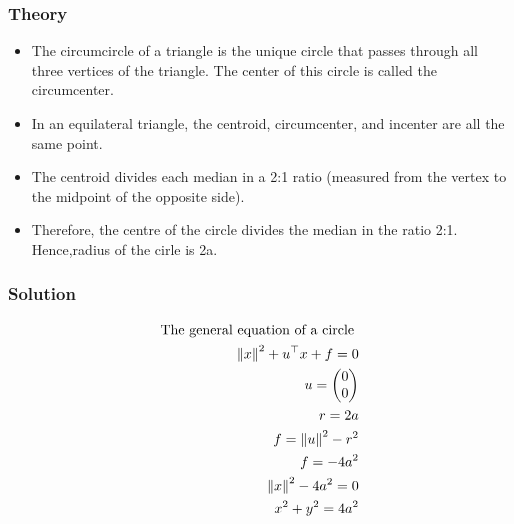\documentclass{beamer}
\begin{document}
\begin{frame}
\frametitle{Theory}

     \begin{itemize}

     \item The circumcircle of a triangle is the unique circle that passes through all three vertices of the triangle. The center of this circle is called the circumcenter.
     
    \item   In an equilateral triangle, the centroid, circumcenter, and incenter are all the same point.
    
    \item  The centroid divides each median in a 2:1 ratio (measured from the vertex to the midpoint of the opposite side).
    
    \item  Therefore, the centre of the circle divides the median in the ratio 2:1. Hence,radius of the cirle is 2a.
    \end{itemize}
    
\end{frame}

\begin{frame}
\frametitle{Solution}
\begin{align}
   \text{The general equation of a circle }\\
{\left\lVert x\right\rVert} ^ 2 + {u}^\top x + f =0\\
u = \begin{pmatrix}0\\ 0\end{pmatrix}\\
r = 2a\\
f = {\left\lVert u\right\rVert}^2 - {r}^2 \\
f = -4 {a} ^2\\
{\left\lVert x\right\rVert} ^ 2 - 4a ^2 =0\\
x^2 + y^2 = 4a^2
\end{align}
\end{frame}
 
\end{document}
